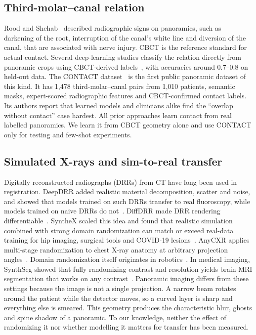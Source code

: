 \documentclass[preprint,12pt]{elsarticle}
\begin{document}
\subsection{Third-molar--canal relation}
Rood and Shehab~\cite{rood1990} described radiographic signs on panoramics, such as darkening of the root, interruption
of the canal's white line and diversion of the canal, that are associated with nerve injury. CBCT is the reference
standard for actual contact. Several deep-learning studies classify the relation directly from panoramic crops using
CBCT-derived labels~\cite{fukuda2020,jeon2023}, with accuracies around 0.7--0.8 on held-out data. The CONTACT
dataset~\cite{ulusoy2025} is the first public panoramic dataset of this kind. It has 1,478 third-molar--canal pairs from
1,010 patients, semantic masks, expert-scored radiographic features and CBCT-confirmed contact labels. Its authors report
that learned models and clinicians alike find the ``overlap without contact'' case hardest. All prior approaches learn
contact from real labelled panoramics. We learn it from CBCT geometry alone and use CONTACT only for testing and few-shot
experiments.

\subsection{Simulated X-rays and sim-to-real transfer}
Digitally reconstructed radiographs (DRRs) from CT have long been used in registration. DeepDRR added realistic material
decomposition, scatter and noise, and showed that models trained on such DRRs transfer to real fluoroscopy, while models
trained on naive DRRs do not~\cite{unberath2018,unberath2019}. DiffDRR made DRR rendering
differentiable~\cite{gopalakrishnan2022}. SyntheX scaled this idea and found that realistic simulation combined with
strong domain randomization can match or exceed real-data training for hip imaging, surgical tools and COVID-19
lesions~\cite{gao2023}. AnyCXR applies multi-stage randomization to chest X-ray anatomy at arbitrary projection
angles~\cite{dong2025}. Domain randomization itself originates in robotics~\cite{tobin2017}. In medical imaging, SynthSeg
showed that fully randomizing contrast and resolution yields brain-MRI segmentation that works on any
contrast~\cite{billot2023}. Panoramic imaging differs from these settings because the image is not a single projection.
A narrow beam rotates around the patient while the detector moves, so a curved layer is sharp and everything else is
smeared. This geometry produces the characteristic blur, ghosts and spine shadow of a panoramic. To our knowledge,
neither the effect of randomizing it nor whether modelling it matters for transfer has been measured.
\end{document}
